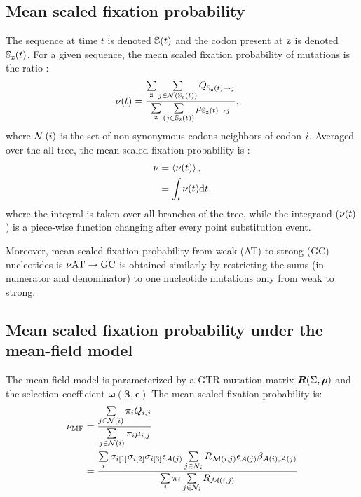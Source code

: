 \subsection{Mean scaled fixation probability}
\label{subsec:fixation-bias}
The sequence at time $t$ is denoted $\mathbb{S}(t)$ and the codon present at $\text{z}$ is denoted $\mathbb{S}_{\text{z}}(t)$.
For a given sequence, the mean scaled fixation probability of mutations is the ratio :
\begin{align}
    \nu (t) & = \dfrac{ \sum\limits_{\text{z}} \sum\limits_{{j} \in \mathcal{N} \left ( \mathbb{S}_{\text{z}}(t) \right)} Q_{\mathbb{S}_{\text{z}}(t) \to {j}}}{ \sum\limits_{\text{z}} \sum\limits_{\left ( {j} \in \mathbb{S}_{\text{z}}(t) \right)} \mu_{\mathbb{S}_{\text{z}}(t) \to {j}}},
\end{align}
where $\mathcal{N}\left({i}\right)$ is the set of non-synonymous codons neighbors of codon ${i}$.
Averaged over the all tree, the mean scaled fixation probability is :
\begin{align}
    \nu & = \left\langle \nu (t) \right\rangle, \\
             & = \int_{t} \nu (t) \text{d} t,
\end{align}
where the integral is taken over all branches of the tree, while the integrand ($\nu (t)$) is a piece-wise function changing after every point substitution event.

Moreover, mean scaled fixation probability from weak (AT) to strong (GC) nucleotides is $\nu{\text{AT} \rightarrow \text{GC}}$ is obtained similarly by restricting the sums (in numerator and denominator) to one nucleotide mutations only from weak to strong.

\subsection{Mean scaled fixation probability under the mean-field model}
\label{sec:mut-bias-mean-field-omega}

The mean-field model is parameterized by a GTR mutation matrix $\bm{R}(\Sigma, \bm{\rho})$ and the selection coefficient $\bm{\omega}(\bm{\beta}, \bm{\epsilon})$
The mean scaled fixation probability is:
\begin{align}
    \nu_{\text{MF}} & = \dfrac{  \sum\limits_{{j} \in \mathcal{N}\left({i}\right)} \pi_{{i}} Q_{{i}, {j}}}{ \sum\limits_{{j} \in \mathcal{N}\left({i}\right)} \pi_{{i}} \mu_{{i}, {j}}} \\
            & = \dfrac{ \sum\limits_{i} \sigma_{{i}[1]}\sigma_{{i}[2]}\sigma_{{i}[3]} \epsilon_{\mathcal{A}({j})} \sum\limits_{j \in \mathcal{N}_{{i}}} R_{\mathcal{M}({i}, {j})} \epsilon_{\mathcal{A}({j})} \beta_{\mathcal{A}({i}), \mathcal{A}({j})} }{\sum\limits_{i} \pi_{i} \sum\limits_{j \in \mathcal{N}_{{i}} } R_{\mathcal{M}({i}, {j})}}
\end{align}

